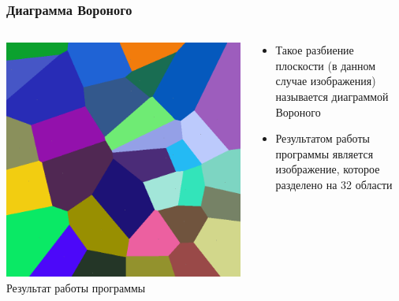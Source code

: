 \documentclass[10pt]{beamer}
\begin{document}
\begin{frame}
\frametitle{Диаграмма Вороного}


\begin{columns}[c]

\begin{center}
  \includegraphics[width=\textwidth]{res/img/VoronoiDiagram.png}
  Результат работы программы
\end{center}

\begin{block}{}
\begin{itemize}
  \item Такое разбиение плоскости (в данном случае изображения) называется диаграммой Вороного
  \item Результатом работы программы является изображение, которое разделено на 32 области
\end{itemize}
\end{block}

\end{columns}

\end{frame}
\end{document}
